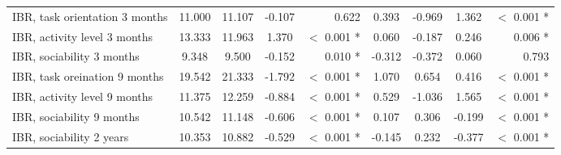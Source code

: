 \begin{tabular}{l c c c r c c c r}
IBR, task orientation 3 months & 11.000 & 11.107 & -0.107 & 0.622 & 0.393 & -0.969 & 1.362 & $ < $ 0.001 * \\
IBR, activity level 3 months & 13.333 & 11.963 & 1.370 & $ < $ 0.001 * & 0.060 & -0.187 & 0.246 & 0.006 * \\
IBR, sociability 3 months & 9.348 & 9.500 & -0.152 & 0.010 * & -0.312 & -0.372 & 0.060 & 0.793 \\
IBR, task oreination 9 months & 19.542 & 21.333 & -1.792 & $ < $ 0.001 * & 1.070 & 0.654 & 0.416 & $ < $ 0.001 * \\
IBR, activity level 9 months & 11.375 & 12.259 & -0.884 & $ < $ 0.001 * & 0.529 & -1.036 & 1.565 & $ < $ 0.001 * \\
IBR, sociability 9 months & 10.542 & 11.148 & -0.606 & $ < $ 0.001 * & 0.107 & 0.306 & -0.199 & $ < $ 0.001 * \\
IBR, sociability 2 years & 10.353 & 10.882 & -0.529 & $ < $ 0.001 * & -0.145 & 0.232 & -0.377 & $ < $ 0.001 * \\
\bottomrule
\end{tabular}
